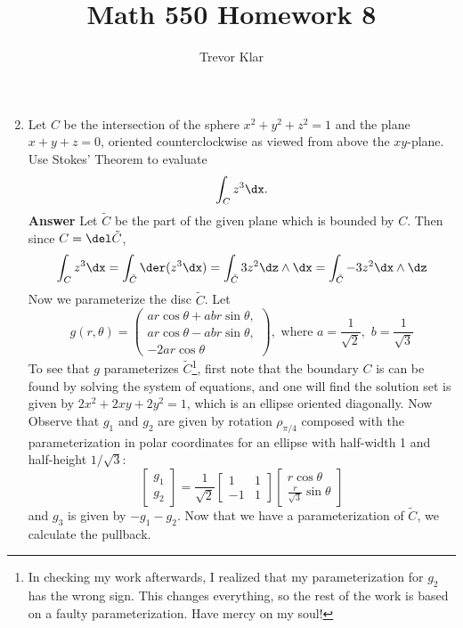 \documentclass[letterpaper]{article}
\title{Math 550 \linebreak
Homework 8}
\author{Trevor Klar}
\begin{document}
\maketitle

\begin{enumerate}\setcounter{enumi}{1}
	\item Let $C$ be the intersection of the sphere $x^2+y^2+z^2=1$ and the plane $x+y+z=0$, oriented counterclockwise as viewed from above the $xy$-plane. Use Stokes' Theorem to evaluate 
	$$\int_Cz^3\dx.$$
	\textbf{Answer} Let $\tilde{C}$ be the part of the given plane which is bounded by $C$. Then since $C=\del\tilde{C}$, 
	$$\int_C z^3\dx=\int_{\tilde{C}}\der(z^3\dx)=\int_{\tilde{C}}3z^2\dz\wedge\dx=\int_{\tilde{C}}-3z^2\dx\wedge\dz$$
	Now we parameterize the disc $\tilde{C}$. Let 
	\[g(r,\theta)=\left(
	\begin{array}{c}
	  ar\cos\theta+abr\sin\theta,\\
	  ar\cos\theta-abr\sin\theta,\\
	  -2ar\cos\theta
	\end{array}\right), \text{ where }a=\frac{1}{\sqrt{2}}, \, \, b=\frac{1}{\sqrt{3}}\]
	To see that $g$ parameterizes $\tilde{C}$\footnote{In checking my work afterwards, I realized that my parameterization for $g_2$ has the wrong sign. This changes everything, so the rest of the work is based on a faulty parameterization. Have mercy on my soul!}, first note that the boundary $C$ is can be found by solving the system of equations, and one will find the solution set is given by $2x^2+2xy+2y^2=1$, which is an ellipse oriented diagonally. Now Observe that $g_1$ and $g_2$ are given by rotation $\rho_{\pi/4}$ composed with the parameterization in polar coordinates for an ellipse with half-width 1 and half-height $1/\sqrt{3}$:
	\[\left[\begin{array}{c}
	g_1\\g_2
	\end{array}\right]
	=
	\frac{1}{\sqrt{2}}\left[\begin{array}{cc}
	1&1\\
	-1&1
	\end{array}\right]
	\left[\begin{array}{c}
	r\cos\theta\\
	\frac{r}{\sqrt{3}}\sin\theta
  \end{array}\right]		
	\]
	and $g_3$ is given by $-g_1-g_2$. Now that we have a parameterization of $\tilde{C}$, we calculate the pullback.

\end{enumerate}
\end{document}
